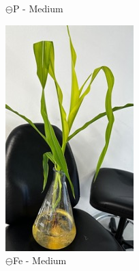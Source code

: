 \documentclass[10pt,a4paper]{article}
\begin{document}
\begin{figure}[H]
\begin{subfigure}[b]{0.235\textwidth}
				\caption{$\ominus$P - Medium}
				\label{fig:minus P_}
			\end{subfigure}
			\hfill
			\vspace*{0.8cm}
			\begin{subfigure}[b]{0.25\textwidth}
				\includegraphics[width=\textwidth]{MinusFe.jpg}
				\caption{$\ominus$Fe - Medium}
				\label{fig:minus Fe}
			\end{subfigure}
			\hfill
			\begin{subfigure}[b]{0.215\textwidth}

\end{subfigure}
\end{figure}
\end{document}
